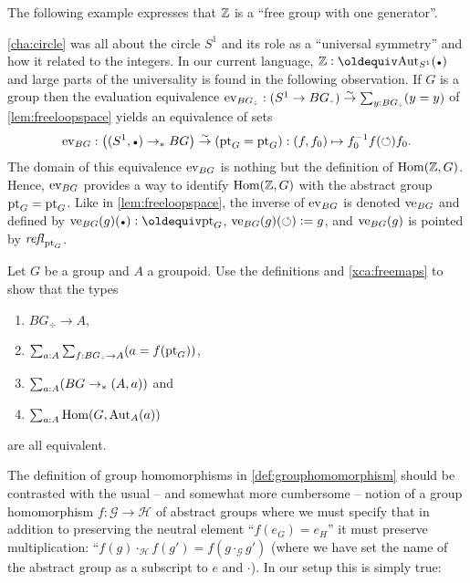 \begin{example}
\end{example}

The following example expresses that $\mathbb{Z}$ is a ``free group with one generator''.

\begin{example}
  \label{ex:Zinitial}
  \cref{cha:circle} was all about the circle $S^1$ and its role as a
  ``universal symmetry'' and how it related to the integers.  In our
  current language, $\ZZ\defequi\aut_{S^1}(\base)$ and large parts of
  the universality is found in the following observation.  If $G$ is a
  group then the evaluation equivalence
  $\ev_{BG_\div}:(S^1\to BG_\div)\we \sum_{y:BG_\div}(y=y)$ of
  \cref{lem:freeloopspace} yields an equivalence of sets
  $$\ev_{BG}:\left((S^1,\base)\ptdto BG\right)\we (\pt_G=\pt_G)
            : (f,f_0)\mapsto f_0^{-1}f(\Sloop)f_0.$$
  The domain of this equivalence $\mathrm{ev}_{BG}$ is nothing but the
  definition of $\mathrm{Hom}(\mathbb{Z},G)$. Hence, $\mathrm{ev}_{BG}$ provides a way to
  identify $\mathrm{Hom}(\mathbb{Z},G)$ with the abstract group $\mathrm{pt}_G=\mathrm{pt}_G$.
Like in \cref{lem:freeloopspace}, the inverse of $\mathrm{ev}_{BG}$
is denoted $\mathrm{ve}_{BG}$ and defined by $\ve_{BG}(g)(\base)\defeq\pt_G$, 
$\mathrm{ve}_{BG}(g)(\circlearrowleft)\vcentcolon= g$, and $\mathrm{ve}_{BG}(g)$ is pointed by $\mathop{\mathit{refl}_{\mathrm{pt}_G}}$.
\end{example}

\begin{xca}\label{xca:BGtotype}
  Let $G$ be a group and $A$ a groupoid.  Use the definitions and
  \cref{xca:freemaps} to show that the types
  \begin{enumerate}
  \item $BG_\div\to A$, 
  \item $\sum_{a:A}\sum_{f:BG_\div \to A}(a=f(\pt_G))$, 
  \item $\sum_{a:A}(BG\to_\ast(A,a))$ and 
  \item $\sum_{a:A}\mathrm{Hom}(G,\mathrm{Aut}_A(a))$
  \end{enumerate}
 are all equivalent.
\end{xca}

The definition of group homomorphisms in \cref{def:grouphomomorphism} should be contrasted with the usual -- and somewhat more cumbersome -- notion of a group homomorphism $f\colon \mathcal G\to \mathcal H$ of abstract groups where we must specify that in addition to preserving the neutral element ``$f(e_G)=e_H$'' it must preserve multiplication: ``$f(g)\cdot_{\mathcal H} f(g')=f(g\cdot_{\mathcal G} g')$ (where we have set the name of the abstract group as a subscript to $e$ and $\cdot$).  In our setup this is simply true:

